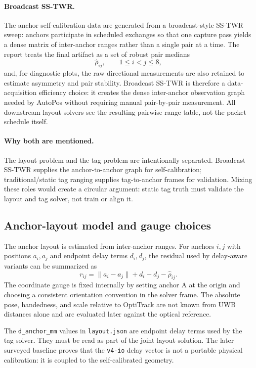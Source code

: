 \documentclass[11pt,a4paper]{article}
\begin{document}
\paragraph{Broadcast SS-TWR.}
The anchor self-calibration data are generated from a broadcast-style SS-TWR sweep: anchors
participate in scheduled exchanges so that one capture pass yields a dense matrix of
inter-anchor ranges rather than a single pair at a time. The report treats the final
artifact as a set of robust pair medians
\[
  \hat{\rho}_{ij}, \qquad 1\le i < j \le 8,
\]
and, for diagnostic plots, the raw directional measurements are also retained to estimate
asymmetry and pair stability. Broadcast SS-TWR is therefore a data-acquisition efficiency
choice: it creates the dense inter-anchor observation graph needed by AutoPos without
requiring manual pair-by-pair measurement. All downstream layout solvers see the resulting
pairwise range table, not the packet schedule itself.

\paragraph{Why both are mentioned.}
The layout problem and the tag problem are intentionally separated. Broadcast SS-TWR
supplies the anchor-to-anchor graph for self-calibration; traditional/static tag ranging
supplies tag-to-anchor frames for validation. Mixing these roles would create a circular
argument: static tag truth must validate the layout and tag solver, not train or align it.

\subsection{Anchor-layout model and gauge choices}
The anchor layout is estimated from inter-anchor ranges. For anchors $i,j$ with positions
$a_i,a_j$ and endpoint delay terms $d_i,d_j$, the residual used by delay-aware variants can
be summarized as
\[
  r_{ij} = \lVert a_i-a_j\rVert + d_i + d_j - \hat{\rho}_{ij}.
\]
The coordinate gauge is fixed internally by setting anchor A at the origin and choosing a
consistent orientation convention in the solver frame. The absolute pose, handedness, and
scale relative to OptiTrack are not known from UWB distances alone and are evaluated later
against the optical reference.

The \texttt{d\_anchor\_mm} values in \texttt{layout.json} are endpoint delay terms used by
the tag solver. They must be read as part of the joint layout solution. The later surveyed
baseline proves that the \texttt{v4-io} delay vector is not a portable physical calibration:
it is coupled to the self-calibrated geometry.
\end{document}
